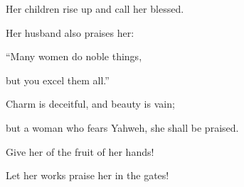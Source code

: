 {\par }{\Q {}Her children rise up and call her blessed.
\par }{\QB Her husband also praises her:
\par }{\Q {}“Many women do noble things,
\par }{\QB but you excel them all.”
\par }{\Q {}Charm is deceitful, and beauty is vain;
\par }{\QB but a woman who fears Yahweh, she shall be praised.
\par }{\Q {}Give her of the fruit of her hands!
\par }{\QB Let her works praise her in the gates!
\par }